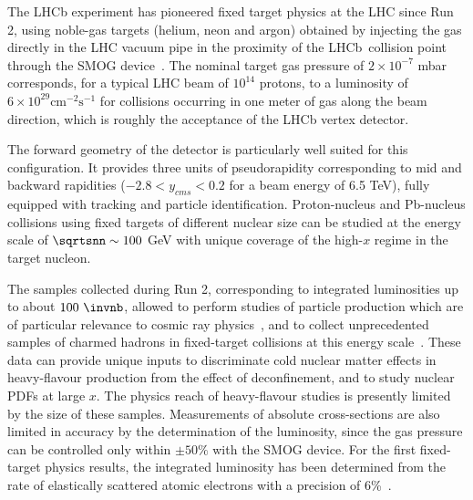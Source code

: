 \documentclass[../report.tex]{subfiles}
\begin{document}
The LHCb experiment has pioneered fixed target physics at the LHC since Run 2, 
using noble-gas targets (helium, neon and argon) obtained by injecting the gas directly in 
the LHC vacuum pipe in the proximity of the LHCb~collision point
through the SMOG device~\cite{smog}.
The nominal target gas pressure of $2 \times 10^{-7}$ mbar corresponds,
for a typical LHC beam of $10^{14}$ protons, to a luminosity of 
$6 \times 10^{29} \text{cm}^{-2}\text{s}^{-1}$ for collisions occurring in one
meter of gas along the beam direction, which is roughly the acceptance of the
LHCb vertex detector.

The forward geometry of the detector is particularly well suited for
this configuration.  It provides three units
of pseudorapidity corresponding to mid and backward rapidities ($-2.8 < y_{cms}< 0.2$
for a beam energy of 6.5 TeV), fully equipped with tracking and particle identification. 
Proton-nucleus and Pb-nucleus collisions using fixed targets of different
nuclear size can be studied at the energy scale of $\sqrtsnn \sim 100$
GeV with unique coverage of the high-$x$ regime in the target nucleon.

The samples collected during Run 2, corresponding
to integrated luminosities up to about $100~\invnb$, 
allowed to perform 
studies of particle production which are of particular relevance
to cosmic ray physics~\cite{LHCb-PAPER-2018-031}, and to
collect unprecedented samples of charmed hadrons in
fixed-target collisions at this energy
scale~\cite{LHCb-PAPER-2018-023}. 
These data can provide unique inputs to
discriminate cold nuclear matter effects in heavy-flavour production
from the effect of deconfinement, and to study nuclear PDFs 
at large $x$. The physics reach of heavy-flavour studies is presently
limited by the size of these samples. Measurements of absolute
cross-sections are also limited in accuracy by the determination of the
luminosity, since the gas pressure can be controlled only
within $\pm 50\%$ with the SMOG device. For the first fixed-target physics
results, the integrated luminosity has been determined from the rate of
elastically scattered atomic electrons with a precision of
6\%~\cite{LHCb-PAPER-2018-031}. 
\end{document}
